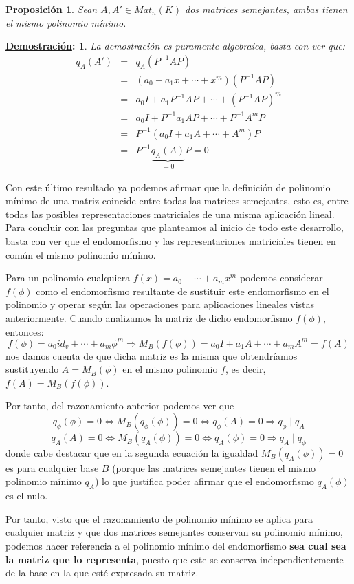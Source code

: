 \documentclass[10pt,a4paper,openright]{book}
\theoremstyle{break}
\newtheorem*{prop}{Proposición}
\newtheorem*{demo}{\underline{Demostración}:}
\begin{document}
\begin{prop}
Sean $A, A'\in Mat_n(K)$ dos matrices semejantes, ambas tienen el mismo polinomio mínimo.
\end{prop}
\begin{demo}
La demostración es puramente algebraica, basta con ver que:
\begin{eqnarray*}
q_A(A')
&=& q_A(P^{-1}AP) \\
&=& (a_0+a_1x+\cdots+x^m)(P^{-1}AP) \\
&=& a_0I+a_1P^{-1}AP+\cdots+(P^{-1}AP)^m \\
&=& a_0I+P^{-1}a_1AP+\cdots+ P^{-1}A^mP \\
&=& P^{-1}(a_0I+a_1A+\cdots+A^m)P \\
&=& P^{-1}\underbrace{q_A(A)}_{=0}P = 0
\end{eqnarray*}
\end{demo}

Con este último resultado ya podemos afirmar que la definición de polinomio mínimo de una matriz coincide entre todas las matrices semejantes, esto es, entre todas las posibles representaciones matriciales de una misma aplicación lineal. Para concluir con las preguntas que planteamos al inicio de todo este desarrollo, basta con ver que el endomorfismo y las representaciones matriciales tienen en común el mismo polinomio mínimo.

Para un polinomio cualquiera $f(x) = a_0+\cdots+a_mx^m$ podemos considerar $f(\phi)$ como el endomorfismo resultante de sustituir este endomorfismo en el polinomio y operar según las operaciones para aplicaciones lineales vistas anteriormente. Cuando analizamos la matriz de dicho endomorfismo $f(\phi)$, entonces:
$$
f(\phi)= a_0 id_v+\cdots+a_m\phi^m \Rightarrow M_B(f(\phi))=a_0I+a_1A+\cdots+a_mA^m = f(A)
$$
nos damos cuenta de que dicha matriz es la misma que obtendríamos sustituyendo $A=M_B(\phi)$ en el mismo polinomio $f$, es decir, $f(A) = M_B(f(\phi))$.

Por tanto, del razonamiento anterior podemos ver que
$$
q_\phi (\phi)=0\Leftrightarrow M_B(q_\phi(\phi))= 0\Leftrightarrow q_\phi(A)=0 \Rightarrow q_\phi \mid q_A
$$
$$
q_A(A) = 0 \Leftrightarrow M_B(q_A(\phi)) = 0 \Leftrightarrow q_A(\phi) = 0\Rightarrow q_A\mid q_\phi
$$
donde cabe destacar que en la segunda ecuación la igualdad $M_B(q_A(\phi)) = 0$ es para cualquier base $B$ (porque las matrices semejantes tienen el mismo polinomio mínimo $q_A$) lo que justifica poder afirmar que el endomorfismo $q_A(\phi)$ es el nulo.

Por tanto, visto que el razonamiento de polinomio mínimo se aplica para cualquier matriz y que dos matrices semejantes conservan su polinomio mínimo, podemos hacer referencia a el polinomio mínimo del endomorfismo \textbf{sea cual sea la matriz que lo representa}, puesto que este se conserva independientemente de la base en la que esté expresada su matriz.
\end{document}
